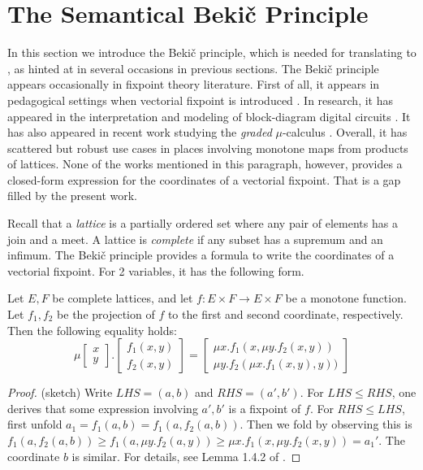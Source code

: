 \begin{btheorem}
    
\end{btheorem}
\section{The Semantical Beki\v{c} Principle}
\label{sec:Bekic}
In this section we introduce the Beki\v{c} principle, which is needed for translating \GLs{} to \RGL{}, as hinted at in several occasions in previous sections. The Beki\v{c} principle appears occasionally in fixpoint theory literature. First of all, it appears in pedagogical settings when vectorial fixpoint is introduced \cite{venema-notes}. In research, it has appeared in the interpretation and modeling of block-diagram digital circuits \cite{Synchronous-block}. It has also appeared in recent work studying the \textit{graded} $\mu$-calculus \cite{Parallel-graphs}. Overall, it has scattered but robust use cases in places involving monotone maps from products of lattices. None of the works mentioned in this paragraph, however, provides a closed-form expression for the coordinates of a vectorial fixpoint. That is a gap filled by the present work.

Recall that a \textit{lattice} is a partially ordered set where any pair of elements has a join and a meet. A lattice is \textit{complete} if any subset has a supremum and an infimum. The Beki\v{c} principle provides a formula to write the coordinates of a vectorial fixpoint. For 2 variables, it has the following form.

\begin{theorem}
    \label{thm:Bekic2}
    Let $E,F$ be complete lattices, and let $f: E\times F \rightarrow E\times F$ be a monotone function. Let $f_1,f_2$ be the projection of $f$ to the first and second coordinate, respectively. Then the following equality holds:
    \begin{equation}
    \label{eqn:binary_Bekic}
    \mu \begin{bmatrix}
        x \\ y
    \end{bmatrix}. \begin{bmatrix}
        f_1(x,y) \\
        f_2(x,y)
    \end{bmatrix} = \begin{bmatrix}
        \mu x. f_1(x,\mu y.f_2(x,y)) \\
        \mu y. f_2(\mu x.f_1(x,y),y))
    \end{bmatrix}
    \end{equation}
\end{theorem}
\begin{proof}(sketch)
    Write $LHS = (a,b)$ and $RHS = (a',b')$. For $LHS \leq RHS$, one derives that some expression involving $a',b'$ is a fixpoint of $f$. For $RHS \leq LHS$, first unfold $a_1 = f_1(a,b) = f_1(a, f_2(a,b))$. Then we fold by observing this is $f_1(a, f_2(a,b))\geq f_1(a, \mu y. f_2(a,y)) \geq \mu x. f_1(x,\mu y. f_2(x,y)) = a_1'$. The coordinate $b$ is similar. For details, see Lemma 1.4.2 of \cite{arnold2001rudiments}. 
\end{proof}

